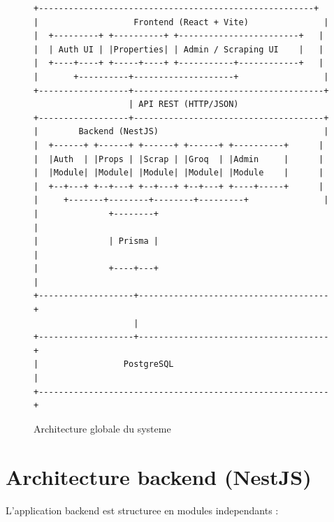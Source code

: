 \documentclass[12pt,a4paper]{report}
\begin{document}
\begin{figure}[H]
\centering
\begin{minipage}{0.9\textwidth}
\footnotesize
\begin{verbatim}
+-------------------------------------------------------+
|                   Frontend (React + Vite)               |
|  +---------+ +----------+ +------------------------+   |
|  | Auth UI | |Properties| | Admin / Scraping UI    |   |
|  +----+----+ +-----+----+ +-----------+------------+   |
|       +----------+--------------------+                 |
+------------------+--------------------------------------+
                   | API REST (HTTP/JSON)
+------------------+--------------------------------------+
|        Backend (NestJS)                                 |
|  +------+ +------+ +------+ +------+ +----------+      |
|  |Auth  | |Props | |Scrap | |Groq  | |Admin     |      |
|  |Module| |Module| |Module| |Module| |Module    |      |
|  +--+---+ +--+---+ +--+---+ +--+---+ +----+-----+      |
|     +-------+--------+--------+---------+               |
|              +--------+                                  |
|              | Prisma |                                  |
|              +----+---+                                  |
+-------------------+--------------------------------------+
                    |
+-------------------+--------------------------------------+
|                 PostgreSQL                                |
+----------------------------------------------------------+
\end{verbatim}
\end{minipage}
\caption{Architecture globale du systeme}
\end{figure}

\section{Architecture backend (NestJS)}

L'application backend est structuree en modules independants :
\end{document}
